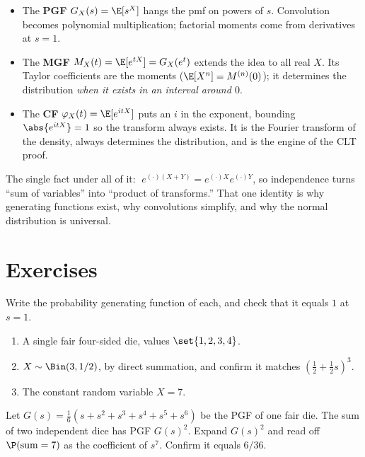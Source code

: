\begin{itemize}
  \item The \textbf{PGF} $G_X(s)=\E[s^X]$ hangs the pmf on powers of $s$.
        Convolution becomes polynomial multiplication; factorial moments come
        from derivatives at $s=1$.
  \item The \textbf{MGF} $M_X(t)=\E[e^{tX}]=G_X(e^t)$ extends the idea to all
        real $X$. Its Taylor coefficients are the moments
        ($\E[X^n]=M^{(n)}(0)$); it determines the distribution \emph{when it
        exists in an interval around $0$}.
  \item The \textbf{CF} $\varphi_X(t)=\E[e^{itX}]$ puts an $i$ in the exponent,
        bounding $\abs{e^{itX}}=1$ so the transform always exists. It is the
        Fourier transform of the density, always determines the distribution,
        and is the engine of the CLT proof.
\end{itemize}

The single fact under all of it: $\;e^{(\cdot)(X+Y)}=e^{(\cdot)X}e^{(\cdot)Y}$,
so independence turns ``sum of variables'' into ``product of transforms.'' That
one identity is why generating functions exist, why convolutions simplify, and
why the normal distribution is universal.

\section{Exercises}
\label{ch18:exercises}

\begin{exercise}
\label{ch18:ex-warmup}
Write the probability generating function of each, and check that it equals $1$
at $s=1$.
\begin{enumerate}[label=(\alph*)]
  \item A single fair four-sided die, values $\set{1,2,3,4}$.
  \item $X\sim\Bin(3,1/2)$, by direct summation, and confirm it matches
        $(\tfrac12+\tfrac12 s)^3$.
  \item The constant random variable $X=7$.
\end{enumerate}
\end{exercise}

\begin{exercise}
\label{ch18:ex-twodice}
Let $G(s)=\frac16(s+s^2+s^3+s^4+s^5+s^6)$ be the PGF of one fair die. The sum of
two independent dice has PGF $G(s)^2$. Expand $G(s)^2$ and read off
$\P(\text{sum}=7)$ as the coefficient of $s^7$. Confirm it equals $6/36$.
\end{exercise}

